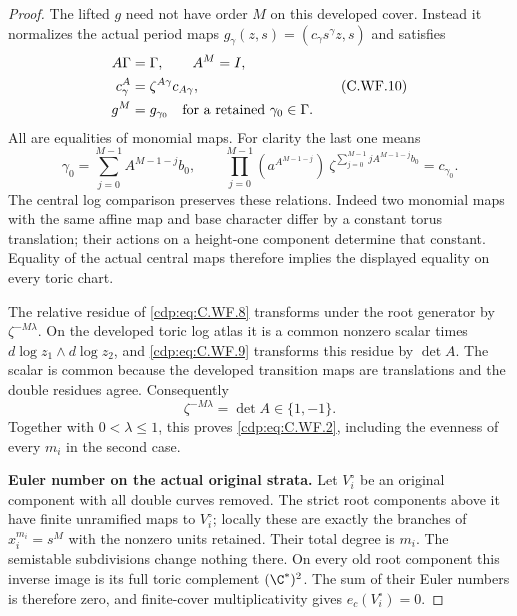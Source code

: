 \begin{proof}
The lifted \(g\) need not have order \(M\) on this developed
cover.  Instead it normalizes the actual period maps
\(g_\gamma(z,s)=(c_\gamma s^\gamma z,s)\) and satisfies
\[
 \begin{split}
 A\Gamma&=\Gamma,\qquad A^M=I,\\
 c_\gamma^A&=\zeta^{A\gamma}c_{A\gamma},\\
 g^M&=g_{\gamma_0}\quad\hbox{for a retained }\gamma_0\in\Gamma .
 \end{split}
\tag{C.WF.10}\label{cdp:eq:C.WF.10}
\]
All are equalities of monomial maps.  For clarity the last
one means
\[
 \gamma_0=\sum_{j=0}^{M-1}A^{M-1-j}b_0,\qquad
 \prod_{j=0}^{M-1}(a^{A^{M-1-j}})
       \ \zeta^{\sum_{j=0}^{M-1}jA^{M-1-j}b_0}
       =c_{\gamma_0}.
\tag{C.WF.11}\label{cdp:eq:C.WF.11}
\]
The central log comparison preserves these relations.
Indeed two monomial maps with the same affine map and base
character differ by a constant torus translation; their
actions on a height-one component determine that constant.
Equality of the actual central maps therefore implies the
displayed equality on every toric chart.

The relative residue of \eqref{cdp:eq:C.WF.8} transforms under the root
generator by \(\zeta^{-M\lambda}\).  On the developed toric
log atlas it is a common nonzero scalar times
\(d\log z_1\wedge d\log z_2\), and \eqref{cdp:eq:C.WF.9} transforms this
residue by \(\det A\).  The scalar is common because the
developed transition maps are translations and the double
residues agree.  Consequently
\[
                  \zeta^{-M\lambda}=\det A\in\{1,-1\}.
\tag{C.WF.12}\label{cdp:eq:C.WF.12}
\]
Together with \(0<\lambda\le1\), this proves \eqref{cdp:eq:C.WF.2},
including the evenness of every \(m_i\) in the second case.

\par\medskip\noindent\textbf{Euler number on the actual original strata.}
Let \(V_i^\circ\) be an original component with all double
curves removed.  The strict root components above it have
finite unramified maps to \(V_i^\circ\); locally these are
exactly the branches of \(x_i^{m_i}=s^M\) with the
nonzero units retained.  Their total degree is \(m_i\).
The semistable subdivisions change nothing there.
On every old root component this inverse image is its full
toric complement \((\C^*)^2\).  The sum of their Euler
numbers is therefore zero, and finite-cover multiplicativity
gives \(e_c(V_i^\circ)=0\).


\end{proof}
